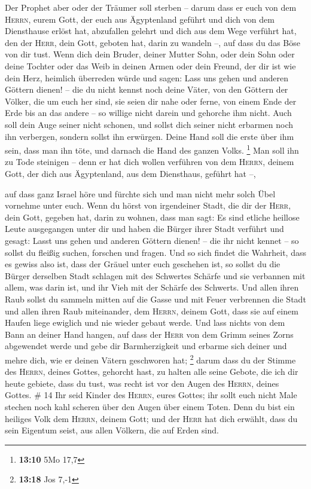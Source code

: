  Der Prophet aber oder der Träumer soll sterben -- darum
dass er euch von dem \textsc{Herrn}, eurem Gott, der euch aus
Ägyptenland geführt und dich von dem Diensthause erlöst hat, abzufallen
gelehrt und dich aus dem Wege verführt hat, den der \textsc{Herr}, dein
Gott, geboten hat, darin zu wandeln --, auf dass du das Böse von dir
tust.  Wenn dich dein Bruder, deiner Mutter Sohn, oder
dein Sohn oder deine Tochter oder das Weib in deinen Armen oder dein
Freund, der dir ist wie dein Herz, heimlich überreden würde und sagen:
Lass uns gehen und anderen Göttern dienen! -- die du nicht kennst noch
deine Väter,  von den Göttern der Völker, die um euch her
sind, sie seien dir nahe oder ferne, von einem Ende der Erde bis an das
andere --  so willige nicht darein und gehorche ihm nicht.
Auch soll dein Auge seiner nicht schonen, und sollst dich seiner nicht
erbarmen noch ihn verbergen,  sondern sollst ihn
erwürgen. Deine Hand soll die erste über ihm sein, dass man ihn töte,
und darnach die Hand des ganzen Volks. \footnote{\textbf{13:10} 5Mo 17,7}
 Man soll ihn zu Tode steinigen -- denn er hat dich
wollen verführen von dem \textsc{Herrn}, deinem Gott, der dich aus
Ägyptenland, aus dem Diensthaus, geführt hat --,

 auf dass ganz Israel höre und fürchte sich und man nicht
mehr solch Übel vornehme unter euch.  Wenn du hörst von
irgendeiner Stadt, die dir der \textsc{Herr}, dein Gott, gegeben hat,
darin zu wohnen, dass man sagt:  Es sind etliche heillose
Leute ausgegangen unter dir und haben die Bürger ihrer Stadt verführt
und gesagt: Lasst uns gehen und anderen Göttern dienen! -- die ihr nicht
kennet --  so sollst du fleißig suchen, forschen und
fragen. Und so sich findet die Wahrheit, dass es gewiss also ist, dass
der Gräuel unter euch geschehen ist,  so sollst du die
Bürger derselben Stadt schlagen mit des Schwertes Schärfe und sie
verbannen mit allem, was darin ist, und ihr Vieh mit der Schärfe des
Schwerts.  Und allen ihren Raub sollst du sammeln mitten
auf die Gasse und mit Feuer verbrennen die Stadt und allen ihren Raub
miteinander, dem \textsc{Herrn}, deinem Gott, dass sie auf einem Haufen
liege ewiglich und nie wieder gebaut werde.  Und lass
nichts von dem Bann an deiner Hand hangen, auf dass der \textsc{Herr}
von dem Grimm seines Zorns abgewendet werde und gebe dir Barmherzigkeit
und erbarme sich deiner und mehre dich, wie er deinen Vätern geschworen
hat; \footnote{\textbf{13:18} Jos 7,-1}  darum dass du
der Stimme des \textsc{Herrn}, deines Gottes, gehorcht hast, zu halten
alle seine Gebote, die ich dir heute gebiete, dass du tust, was recht
ist vor den Augen des \textsc{Herrn}, deines Gottes. \# 14
 Ihr seid Kinder des \textsc{Herrn}, eures Gottes; ihr
sollt euch nicht Male stechen noch kahl scheren über den Augen über
einem Toten.  Denn du bist ein heiliges Volk dem
\textsc{Herrn}, deinem Gott; und der \textsc{Herr} hat dich erwählt,
dass du sein Eigentum seist, aus allen Völkern, die auf Erden sind.

